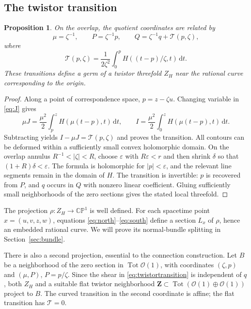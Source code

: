\documentclass[11pt]{article}
\numberwithin{equation}{section}
\newtheorem{proposition}[theorem]{Proposition}
\theoremstyle{definition}
\theoremstyle{remark}
\newcommand{\CP}{\mathbb{CP}}
\newcommand{\OO}{\mathcal O}
\newcommand{\dd}{\mathrm d}
\newcommand{\Tot}{\operatorname{Tot}}
\newcommand{\flatZ}{\mathbf Z}
\newcommand{\calT}{\mathcal T}
\begin{document}
\subsection{The twistor transition}

\begin{proposition}\label{prop:twistortransition}
On the overlap, the quotient coordinates are related by
\begin{equation}\label{eq:twistortransition}
\mu=\zeta^{-1},\qquad P=\zeta^{-1}p,\qquad
Q=\zeta^{-1}q+\calT(p,\zeta),
\end{equation}
where
\begin{equation}\label{eq:shear}
\calT(p,\zeta)=\frac1{2\zeta^2}
\int_0^p H((t-p)/\zeta,t)\,\dd t.
\end{equation}
These transitions define a germ of a twistor threefold $Z_H$ near the rational curve corresponding to the origin.
\end{proposition}
\begin{proof}
Along a point of correspondence space, $p=z-\zeta u$. Changing variable in \eqref{eq:J} gives
\[
\mu J=\frac{\mu^2}{2}\int_p^z H(\mu(t-p),t)\,\dd t,
\qquad
I=\frac{\mu^2}{2}\int_0^z H(\mu(t-p),t)\,\dd t.
\]
Subtracting yields $I-\mu J=\calT(p,\zeta)$ and proves the transition. All contours can be deformed within a sufficiently small convex holomorphic domain. On the overlap annulus $R^{-1}<|\zeta|<R$, choose $\varepsilon$ with $R\varepsilon<r$ and then shrink $\delta$ so that $(1+R)\delta<\varepsilon$. The formula is holomorphic for $|p|<\varepsilon$, and the relevant line segments remain in the domain of $H$. The transition is invertible: $p$ is recovered from $P$, and $q$ occurs in $Q$ with nonzero linear coefficient. Gluing sufficiently small neighborhoods of the zero sections gives the stated local threefold.
\end{proof}

The projection $\rho:Z_H\to\CP^1$ is well defined. For each spacetime point $x=(u,v,z,w)$, equations \eqref{eq:north}--\eqref{eq:south} define a section $L_x$ of $\rho$, hence an embedded rational curve. We will prove its normal-bundle splitting in Section~\ref{sec:bundle}.

There is also a second projection, essential to the connection construction. Let $B$ be a neighborhood of the zero section in $\Tot\OO(1)$, with coordinates $(\zeta,p)$ and $(\mu,P)$, $P=p/\zeta$. Since the shear in \eqref{eq:twistortransition} is independent of $q$, both $Z_H$ and a suitable flat twistor neighborhood $\flatZ\subset\Tot(\OO(1)\oplus\OO(1))$ project to $B$. The curved transition in the second coordinate is affine; the flat transition has $\calT=0$.
\end{document}
